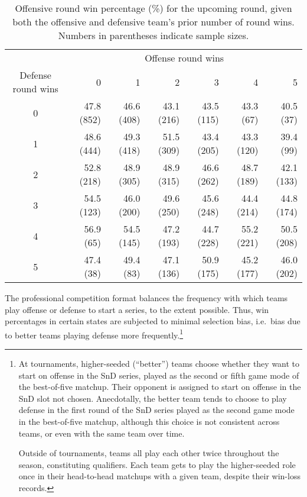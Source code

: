 \documentclass{article}
\begin{document}
\begin{table}

\caption{Offensive round win percentage (\%) for the upcoming round, given both the offensive and defensive team's prior number of round wins. Numbers in parentheses indicate sample sizes.}

\centering
\begin{tabular}{crrrrrr}
\toprule
& \multicolumn{6}{c}{Offense round wins} \\ 
\cmidrule(lr){2-7}
Defense round wins & 0 & 1 & 2 & 3 & 4 & 5 \\ 
\midrule

0 & 47.8 (852) & 46.6 (408) & 43.1 (216) & 43.5 (115) & 43.3 (67)  & 40.5 (37)  \\
1 & 48.6 (444) & 49.3 (418) & 51.5 (309) & 43.4 (205) & 43.3 (120) & 39.4 (99)  \\
2 & 52.8 (218) & 48.9 (305) & 48.9 (315) & 46.6 (262) & 48.7 (189) & 42.1 (133) \\
3 & 54.5 (123) & 46.0 (200) & 49.6 (250) & 45.6 (248) & 44.4 (214) & 44.8 (174) \\
4 & 56.9 (65)  & 54.5 (145) & 47.2 (193) & 44.7 (228) & 55.2 (221) & 50.5 (208) \\
5 & 47.4 (38)  & 49.4 (83)  & 47.1 (136) & 50.9 (175) & 45.2 (177) & 46.0 (202) \\

\bottomrule
\end{tabular}

\label{tbl:o-win-prop-by-series-state}

\end{table}

The professional competition format balances the frequency with which
teams play offense or defense to start a series, to the extent possible.
Thus, win percentages in certain states are subjected to minimal
selection bias, i.e.~bias due to better teams playing defense more
frequently.\footnote{At tournaments, higher-seeded (``better'') teams
  choose whether they want to start on offense in the SnD series, played
  as the second or fifth game mode of the best-of-five matchup. Their
  opponent is assigned to start on offense in the SnD slot not chosen.
  Anecdotally, the better team tends to choose to play defense in the
  first round of the SnD series played as the second game mode in the
  best-of-five matchup, although this choice is not consistent across
  teams, or even with the same team over time.

  Outside of tournaments, teams all play each other twice throughout the
  season, constituting qualifiers. Each team gets to play the
  higher-seeded role once in their head-to-head matchups with a given
  team, despite their win-loss records.}
\end{document}
